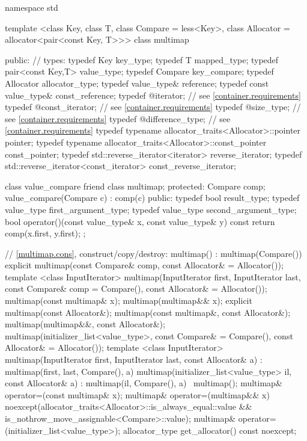 \begin{codeblock}
namespace std {
  template <class Key, class T, class Compare = less<Key>,
            class Allocator = allocator<pair<const Key, T>>>
  class multimap {
  public:
    // types:
    typedef Key                                                 key_type;
    typedef T                                                   mapped_type;
    typedef pair<const Key,T>                                   value_type;
    typedef Compare                                             key_compare;
    typedef Allocator                                           allocator_type;
    typedef value_type&                                         reference;
    typedef const value_type&                                   const_reference;
    typedef @\impdefnc@                              iterator;        // see \ref{container.requirements}
    typedef @\impdefnc@                              const_iterator;  // see \ref{container.requirements}
    typedef @\impdefnc@                              size_type;       // see \ref{container.requirements}
    typedef @\impdefnc@                              difference_type; // see \ref{container.requirements}
    typedef typename allocator_traits<Allocator>::pointer       pointer;
    typedef typename allocator_traits<Allocator>::const_pointer const_pointer;
    typedef std::reverse_iterator<iterator>                     reverse_iterator;
    typedef std::reverse_iterator<const_iterator>               const_reverse_iterator;

    class value_compare {
    friend class multimap;
    protected:
      Compare comp;
      value_compare(Compare c) : comp(c) { }
    public:
      typedef bool result_type;
      typedef value_type first_argument_type;
      typedef value_type second_argument_type;
      bool operator()(const value_type& x, const value_type& y) const {
        return comp(x.first, y.first);
      }
    };

    // \ref{multimap.cons}, construct/copy/destroy:
    multimap() : multimap(Compare()) { }
    explicit multimap(const Compare& comp, const Allocator& = Allocator());
    template <class InputIterator>
      multimap(InputIterator first, InputIterator last,
               const Compare& comp = Compare(),
               const Allocator& = Allocator());
    multimap(const multimap& x);
    multimap(multimap&& x);
    explicit multimap(const Allocator&);
    multimap(const multimap&, const Allocator&);
    multimap(multimap&&, const Allocator&);
    multimap(initializer_list<value_type>,
      const Compare& = Compare(),
      const Allocator& = Allocator());
    template <class InputIterator>
      multimap(InputIterator first, InputIterator last, const Allocator& a)
        : multimap(first, last, Compare(), a) { }
    multimap(initializer_list<value_type> il, const Allocator& a)
      : multimap(il, Compare(), a) { }
    ~multimap();
    multimap& operator=(const multimap& x);
    multimap& operator=(multimap&& x)
      noexcept(allocator_traits<Allocator>::is_always_equal::value &&
               is_nothrow_move_assignable<Compare>::value);
    multimap& operator=(initializer_list<value_type>);
    allocator_type get_allocator() const noexcept;

}}
\end{codeblock}
